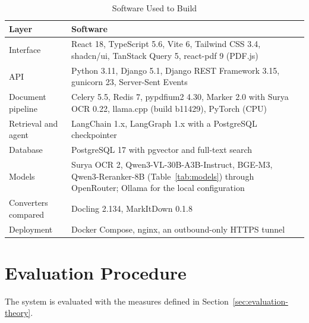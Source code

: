 \begin{table}[htbp]
  \centering
  \caption{Software Used to Build \cs{}}\label{tab:software}
  \small
  \begin{tabularx}{\linewidth}{@{}>{\raggedright\arraybackslash}p{3.2cm}X@{}}
    \toprule
    \textbf{Layer} & \textbf{Software} \\
    \midrule
    Interface & React 18, TypeScript 5.6, Vite 6, Tailwind CSS 3.4, shadcn/ui, TanStack Query 5, react-pdf 9 (PDF.js) \\
    API & Python 3.11, Django 5.1, Django REST Framework 3.15, gunicorn 23, Server-Sent Events \\
    Document pipeline & Celery 5.5, Redis 7, pypdfium2 4.30, Marker 2.0 with Surya OCR 0.22, llama.cpp (build b11429), PyTorch (CPU) \\
    Retrieval and agent & LangChain 1.x, LangGraph 1.x with a PostgreSQL checkpointer \\
    Database & PostgreSQL 17 with pgvector and full-text search \\
    Models & Surya OCR 2, Qwen3-VL-30B-A3B-Instruct, BGE-M3, Qwen3-Reranker-8B (Table~\ref{tab:models}) through OpenRouter; Ollama for the local configuration \\
    Converters compared & Docling 2.134, MarkItDown 0.1.8 \\
    Deployment & Docker Compose, nginx, an outbound-only HTTPS tunnel \\
    \bottomrule
  \end{tabularx}
\end{table}

\section{Evaluation Procedure}\label{sec:evaluation-procedure}

The system is evaluated with the measures defined in Section~\ref{sec:evaluation-theory}.

